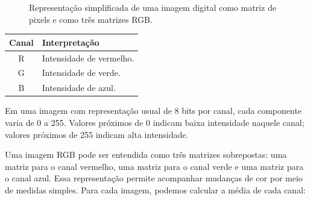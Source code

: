 \documentclass[12pt]{article}
\begin{document}
\begin{figure}[h]
\caption{Representação simplificada de uma imagem digital como matriz de pixels e como três matrizes RGB.}
\label{fig:imagem-matriz-rgb}
\end{figure}

\begin{cmdbox}
\begin{tabularx}{\linewidth}{@{}C >{\raggedright\arraybackslash}X@{}}
\toprule
\textbf{Canal} & \textbf{Interpretação} \\
\midrule
R & Intensidade de vermelho. \\
G & Intensidade de verde. \\
B & Intensidade de azul. \\
\bottomrule
\end{tabularx}
\end{cmdbox}

Em uma imagem com representação usual de 8 bits por canal, cada componente varia de 0 a 255. Valores próximos de 0 indicam baixa intensidade naquele canal; valores próximos de 255 indicam alta intensidade.

Uma imagem RGB pode ser entendida como três matrizes sobrepostas: uma matriz para o canal vermelho, uma matriz para o canal verde e uma matriz para o canal azul. Essa representação permite acompanhar mudanças de cor por meio de medidas simples. Para cada imagem, podemos calcular a média de cada canal:
\end{document}
